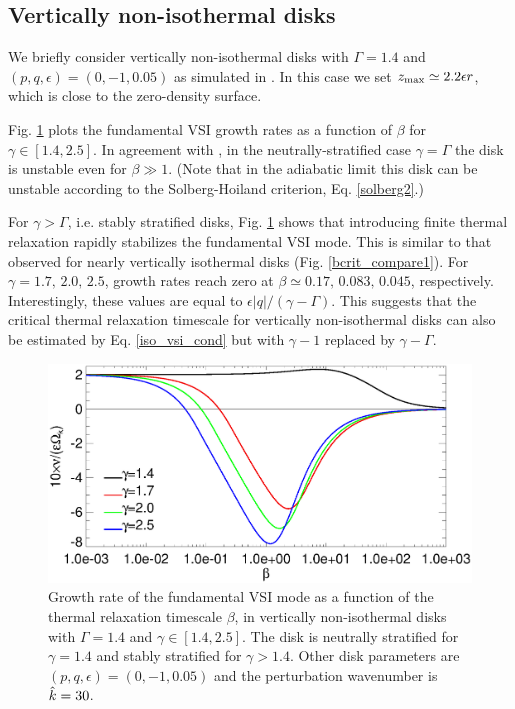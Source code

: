 \subsection{Vertically non-isothermal disks} 
We briefly consider vertically non-isothermal disks with 
$\Gamma=1.4$ and $(p,q,\epsilon)=(0,-1,0.05)$ as simulated in
\cite{nelson13}. In this case we set $z_\mathrm{max}\simeq2.2\epsilon r$, which
is close to the zero-density surface.      

Fig. \ref{gcorr_compare_vnoniso} plots the fundamental VSI growth
rates as a function of $\beta$ for $\gamma\in[1.4,2.5]$. In agreement with \citeauthor{nelson13}, in 
the neutrally-stratified case $\gamma=\Gamma$ the disk is unstable 
even for $\beta\gg 1$. (Note that in the adiabatic limit 
this disk can be unstable according to the
Solberg-Hoiland criterion, Eq. \ref{solberg2}.) 

For $\gamma>\Gamma$, i.e. stably stratified disks,
Fig. \ref{gcorr_compare_vnoniso} shows that introducing finite thermal
relaxation rapidly stabilizes the fundamental VSI mode. This is
similar to that observed for nearly vertically isothermal disks
(Fig. \ref{bcrit_compare1}). For $\gamma=1.7,\,2.0,\,2.5$, growth
rates reach zero at  $\beta\simeq0.17,\,0.083,\,0.045$, respectively.
Interestingly, these values are equal to
$\epsilon|q|/(\gamma-\Gamma)$. This suggests that the critical thermal
relaxation timescale for vertically non-isothermal disks can also be
estimated by Eq. \ref{iso_vsi_cond} but with $\gamma-1$ replaced by
$\gamma-\Gamma$. 

\begin{figure}
  \includegraphics[width=\linewidth,clip=true,trim=0cm 0cm 0cm
  0cm]{figures/gcorr_compare_vnoniso2}
  \caption{Growth rate of the fundamental VSI mode as a function of
    the thermal relaxation timescale $\beta$, in vertically
    non-isothermal disks with $\Gamma=1.4$ and
    $\gamma\in[1.4,2.5]$. The disk is neutrally
    stratified for $\gamma=1.4$ and stably stratified for
    $\gamma>1.4$. Other disk parameters are
    $(p,q,\epsilon)=(0,-1,0.05)$ and the perturbation wavenumber is
    $\hat{k}=30$.  
    \label{gcorr_compare_vnoniso}}
\end{figure}












